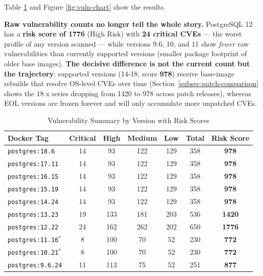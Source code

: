 \documentclass[11pt, a4paper]{article}
\begin{document}
Table \ref{tab:trivy} and Figure \ref{fig:vuln-chart} show the results.

\begin{tcolorbox}[colback=lightred!30, colframe=vuln-critical, title=⚠️ Critical Finding: EOL Versions Will Never Be Patched, fonttitle=\bfseries]
\textbf{Raw vulnerability counts no longer tell the whole story.} PostgreSQL 12 has a \textbf{risk score of 1776} (High Risk) with \textbf{24 critical CVEs} --- the worst profile of any version scanned --- while versions 9.6, 10, and 11 show \textit{fewer} raw vulnerabilities than currently supported versions (smaller package footprint of older base images). \textbf{The decisive difference is not the current count but the trajectory}: supported versions (14-18, score \textbf{978}) receive base-image rebuilds that resolve OS-level CVEs over time (Section~\ref{subsec:patch-comparison} shows the 18.x series dropping from 1420 to 978 across patch releases), whereas EOL versions are frozen forever and will only accumulate more unpatched CVEs.
\end{tcolorbox}

\begin{table}[htbp]
\centering
\caption{Vulnerability Summary by Version with Risk Scores}
\label{tab:trivy}
\begin{tabular}{@{}lcccccc@{}}
	\textbf{Docker Tag} & \textbf{Critical} & \textbf{High} & \textbf{Medium} & \textbf{Low} & \textbf{Total} & \textbf{Risk Score} \\ \midrule
\rowcolor{lightorange} \texttt{postgres:18.6} & 14 & 93 & 122 & 129 & 358 & \textbf{978} \\
\rowcolor{lightorange} \texttt{postgres:17.11} & 14 & 93 & 122 & 129 & 358 & \textbf{978} \\
\rowcolor{lightorange} \texttt{postgres:16.15} & 14 & 93 & 122 & 129 & 358 & \textbf{978} \\
\rowcolor{lightorange} \texttt{postgres:15.19} & 14 & 93 & 122 & 129 & 358 & \textbf{978} \\
\rowcolor{lightorange} \texttt{postgres:14.24} & 14 & 93 & 122 & 129 & 358 & \textbf{978} \\ \midrule
\rowcolor{lightred} \texttt{postgres:13.23} & 19 & 133 & 181 & 203 & 536 & \textbf{1420} \\
\rowcolor{lightred} \texttt{postgres:12.22} & 24 & 162 & 262 & 202 & 650 & \textbf{1776} \\
\rowcolor{lightred} \texttt{postgres:11.16}$^*$ & 8 & 100 & 70 & 52 & 230 & \textbf{772} \\
\rowcolor{lightred} \texttt{postgres:10.21}$^*$ & 8 & 100 & 70 & 52 & 230 & \textbf{772} \\
\rowcolor{lightred} \texttt{postgres:9.6.24} & 11 & 113 & 75 & 52 & 251 & \textbf{877} \\ \bottomrule
\end{tabular}
\end{table}
\end{document}
